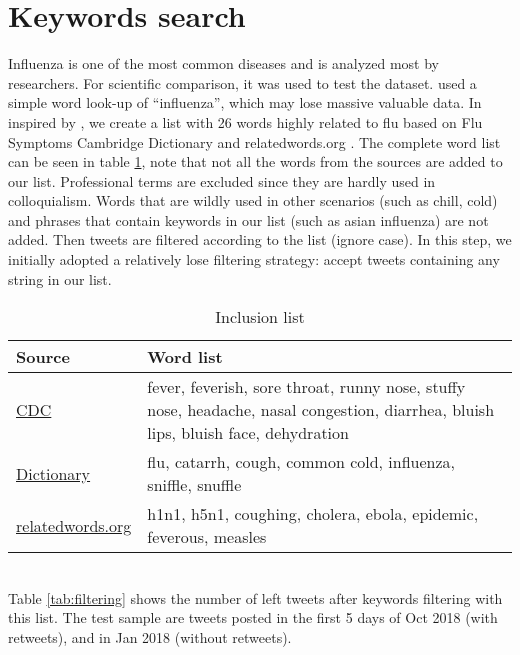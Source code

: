 \section{Keywords search}
\label{sec:Keywords search}
Influenza is one of the most common diseases and is analyzed most by researchers. For scientific comparison, it was used to test the dataset. \cite{aramaki2011twitter} used a simple word look-up of ``influenza'', which may lose massive valuable data. In inspired by \cite{lamb2013separating,lampos2010flu}, we create a list with 26 words highly related to flu based on Flu Symptoms \cite{cdc.symp} Cambridge Dictionary \cite{cambridge} and relatedwords.org \cite{relatedwords.org}. The complete word list can be seen in table \ref{tab:words list}, note that not all the words from the sources are added to our list. Professional terms are excluded since they are hardly used in colloquialism. Words that are wildly used in other scenarios (such as chill, cold) and phrases that contain keywords in our list (such as asian influenza) are not added. Then tweets are filtered according to the list (ignore case). In this step, we initially adopted a relatively lose filtering strategy: accept tweets containing any string in our list. 
\begin{table}[!htbp]
    \centering
    \hspace{0.5cm}
    \begin{tabular}{p{90pt}p{320pt}}
        Source & Word list \\ \hline
        \href{https://www.cdc.gov/flu/symptoms/symptoms.htm}{CDC} &  fever, feverish, sore throat, runny nose, stuffy nose, headache, nasal congestion, diarrhea, bluish lips, bluish face, dehydration\\ \hline
        \href{https://dictionary.cambridge.org/us/topics/disease-and-illness/colds-and-flu/}{Dictionary} & flu, catarrh, cough, common cold, influenza, sniffle, snuffle\\ \hline
        \href{https://relatedwords.org/relatedto/flu}{relatedwords.org} & h1n1, h5n1, coughing, cholera, ebola, epidemic, feverous, measles \\ \hline
    \end{tabular}
    \caption{Inclusion list}
    \label{tab:words list}
\end{table}
\\
Table \ref{tab:filtering} shows the number of left tweets after keywords filtering with this list. The test sample are tweets posted in the first 5 days of Oct 2018 (with retweets), and in Jan 2018 (without retweets). 
